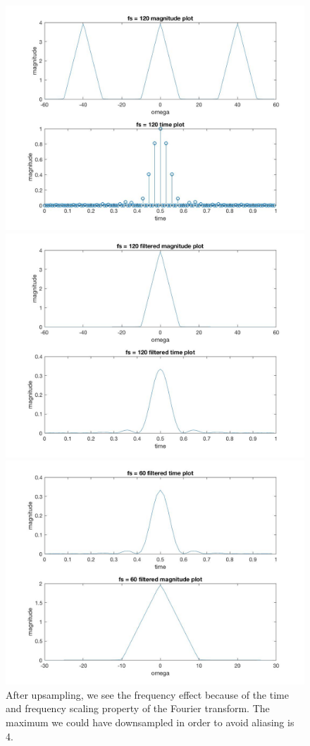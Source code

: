 \documentclass{article}
\begin{document}
\begin{figure}[H]
\includegraphics[scale=.5]{Chipotle2}
\includegraphics[scale=.5]{Chipotle3}
\includegraphics[scale=.5]{Chipotle4}
After upsampling, we see the frequency effect because of the time and frequency scaling property of the Fourier transform. The maximum we could have downsampled in order to avoid aliasing is 4.
\end{figure}
\end{document}
